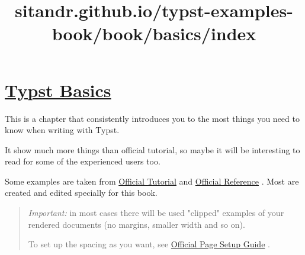 \title{sitandr.github.io/typst-examples-book/book/basics/index}

\section{\texorpdfstring{\hyperref[typst-basics]{Typst
Basics}}{Typst Basics}}\label{typst-basics}

This is a chapter that consistently introduces you to the most things
you need to know when writing with Typst.

It show much more things than official tutorial, so maybe it will be
interesting to read for some of the experienced users too.

Some examples are taken from
\href{https://typst.app/docs/tutorial/}{Official Tutorial} and
\href{https://typst.app/docs/reference/}{Official Reference} . Most are
created and edited specially for this book.

\begin{quote}
\emph{Important:} in most cases there will be used "clipped" examples of
your rendered documents (no margins, smaller width and so on).

To set up the spacing as you want, see
\href{https://typst.app/docs/guides/page-setup-guide/}{Official Page
Setup Guide} .
\end{quote}
